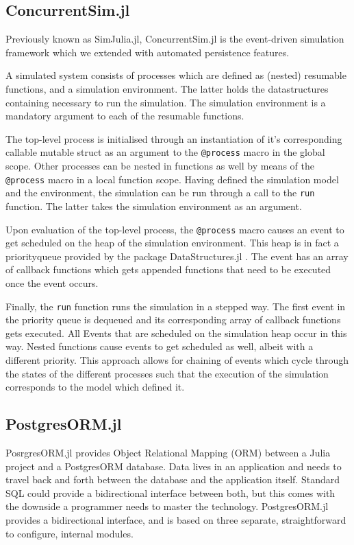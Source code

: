 \documentclass{juliacon}
\begin{document}
\subsection{ConcurrentSim.jl}

Previously known as SimJulia.jl, ConcurrentSim.jl \cite{lauwens2017simjulia,lauwens2017simjuliaSite} is the event-driven simulation framework which we extended with automated persistence features. \vskip 6pt

A simulated system consists of processes which are defined as (nested) resumable functions, and a simulation environment. The latter holds the datastructures containing necessary to run the simulation. The simulation environment is a mandatory argument to each of the resumable functions. \vskip 6pt

The top-level process is initialised through an instantiation of it's corresponding callable mutable struct as an argument to the \texttt{@process} macro in the global scope. Other processes can be nested in functions as well by means of the \texttt{@process} macro in a local function scope. Having defined the simulation model and the environment, the simulation can be run through a call to the \texttt{run} function. The latter takes the simulation environment as an argument. \vskip 6pt

Upon evaluation of the top-level process, the \texttt{@process} macro causes an event to get scheduled on the heap of the simulation environment. This heap is in fact a priorityqueue provided by the package DataStructures.jl \cite{datastructures}. The event has an array of callback functions which gets appended functions that need to be executed once the event occurs. \vskip 6pt

Finally, the \texttt{run} function runs the simulation in a stepped way. The first event in the priority queue is dequeued and its corresponding array of callback functions gets executed. All Events that are scheduled on the simulation heap occur in this way. Nested functions cause events to get scheduled as well, albeit with a different priority. This approach allows for chaining of events which cycle through the states of the different processes such that the execution of the simulation corresponds to the model which defined it. \vskip 6pt

\subsection{PostgresORM.jl}

PosrgresORM.jl \cite{tecnivelPostgresORM} provides Object Relational Mapping (ORM) \cite{russell2008bridging} between a Julia project and a PostgresORM database. Data lives in an application and needs to travel back and forth between the database and the application itself. Standard SQL could provide a bidirectional interface between both, but this comes with the downside a programmer needs to master the technology. PostgresORM.jl provides a bidirectional interface, and is based on three separate, straightforward to configure, internal modules. \vskip 6pt
\end{document}
